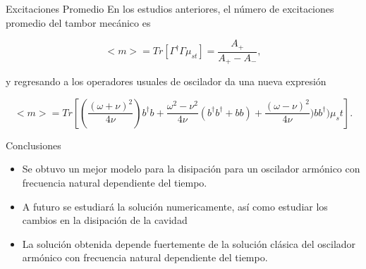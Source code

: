 \documentclass[10pt]{beamer}
\begin{document}
\begin{frame}{Excitaciones Promedio}
En los estudios anteriores, el número de excitaciones promedio del tambor mecánico es

\begin{equation*}
<m> = Tr[\Gamma^\dagger \Gamma \mu_{st}] = \frac{A_+}{A_+ - A_-},
\end{equation*}

y regresando a los operadores usuales de oscilador da una nueva expresión

\begin{equation*}
<m> = Tr[(\frac{(\omega + \nu )^2}{4\nu})b^\dagger b +\frac{\omega^2 - \nu^2}{4\nu}(b^\dagger b^\dagger +bb) +\frac{(\omega - \nu )^2}{4\nu}) b b^\dagger)\mu_st].
\end{equation*}

\end{frame}

\begin{frame}{Conclusiones}

\begin{itemize}
\item Se obtuvo un mejor modelo para la disipación para un oscilador armónico con frecuencia natural dependiente del tiempo.

\item A futuro se estudiará la solución numericamente, así como estudiar los cambios en la disipación de la cavidad

\item La solución obtenida depende fuertemente de la solución clásica del oscilador armónico con frecuencia natural dependiente del tiempo.
\end{itemize}


\end{frame}
\end{document}
